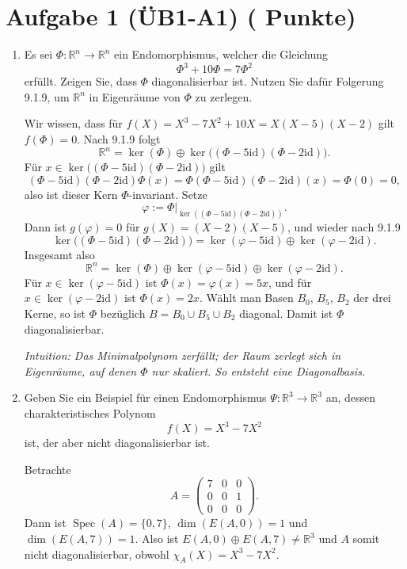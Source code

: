 \documentclass[11pt, a4paper]{article}
\newcommand{\aufgabe}[2]{%
  \section*{\Large\bfseries Aufgabe #1%
  \if\relax\detokenize{#2}\relax\else \hfill\normalfont\normalsize(#2 Punkte)\fi}%
  \vspace{-1.5ex}
}
\begin{document}
\aufgabe{1 (ÜB1-A1)}{}
\begin{enumerate}
  \item Es sei $\Phi:\mathbb{R}^n\to\mathbb{R}^n$ ein Endomorphismus, welcher die Gleichung
  \[
    \Phi^3+10\Phi=7\Phi^2
  \]
  erfüllt. Zeigen Sie, dass $\Phi$ diagonalisierbar ist. Nutzen Sie dafür Folgerung 9.1.9, um $\mathbb{R}^n$ in Eigenräume von $\Phi$ zu zerlegen.
  \begin{framed}
  Wir wissen, dass für $f(X)=X^3-7X^2+10X=X(X-5)(X-2)$ gilt $f(\Phi)=0$. Nach 9.1.9 folgt
  \[
    \mathbb{R}^n=\ker(\Phi)\oplus\ker\!\big((\Phi-5\mathrm{id})(\Phi-2\mathrm{id})\big).
  \]
  Für $x\in\ker\!\big((\Phi-5\mathrm{id})(\Phi-2\mathrm{id})\big)$ gilt
  \[
    (\Phi-5\mathrm{id})(\Phi-2\mathrm{id})\Phi(x)
     =\Phi(\Phi-5\mathrm{id})(\Phi-2\mathrm{id})(x)=\Phi(0)=0,
  \]
  also ist dieser Kern $\Phi$-invariant. Setze
  \[
    \varphi:=\Phi\big|_{\ker((\Phi-5\mathrm{id})(\Phi-2\mathrm{id}))}.
  \]
  Dann ist $g(\varphi)=0$ für $g(X)=(X-2)(X-5)$, und wieder nach 9.1.9
  \[
    \ker\!\big((\Phi-5\mathrm{id})(\Phi-2\mathrm{id})\big)
      =\ker(\varphi-5\mathrm{id})\oplus\ker(\varphi-2\mathrm{id}).
  \]
  Insgesamt also
  \[
    \mathbb{R}^n=\ker(\Phi)\oplus\ker(\varphi-5\mathrm{id})\oplus\ker(\varphi-2\mathrm{id}).
  \]
  Für $x\in\ker(\varphi-5\mathrm{id})$ ist $\Phi(x)=\varphi(x)=5x$, und für
  $x\in\ker(\varphi-2\mathrm{id})$ ist $\Phi(x)=2x$. Wählt man Basen $B_0$,
  $B_5$, $B_2$ der drei Kerne, so ist $\Phi$ bezüglich
  $B=B_0\cup B_5\cup B_2$ diagonal. Damit ist $\Phi$ diagonalisierbar.

  \medskip\noindent\textit{Intuition: Das Minimalpolynom zerfällt; der Raum zerlegt sich in Eigenräume, auf denen $\Phi$ nur skaliert. So entsteht eine Diagonalbasis.}
  \end{framed}

  \item Geben Sie ein Beispiel für einen Endomorphismus $\Psi:\mathbb{R}^3\to\mathbb{R}^3$ an, dessen charakteristisches Polynom
  \[
    f(X)=X^3-7X^2
  \]
  ist, der aber nicht diagonalisierbar ist.
  \begin{framed}
  Betrachte
  \[
    A=\begin{pmatrix}
      7&0&0\\
      0&0&1\\
      0&0&0
    \end{pmatrix}.
  \]
  Dann ist $\operatorname{Spec}(A)=\{0,7\}$, $\dim(E(A,0))=1$ und
  $\dim(E(A,7))=1$. Also ist
  $E(A,0)\oplus E(A,7)\neq\mathbb{R}^3$ und $A$ somit nicht diagonalisierbar,
  obwohl $\chi_A(X)=X^3-7X^2$.


\end{framed}
\end{enumerate}
\end{document}
